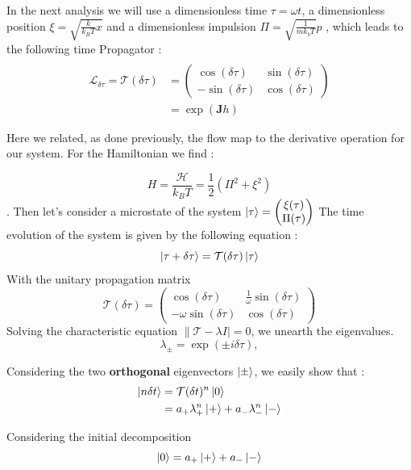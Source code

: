 \documentclass[ansiapaper]{report}
\begin{document}
\begin{multicols}{3}
  In the next analysis we will use a dimensionless time $\tau = \omega t$,  a dimensionless position $\xi = \sqrt{\frac{k}{k_BT}x}$ and a dimensionless impulsion $\Pi = \sqrt{\frac{1}{mk_bT}}p$ , which leads to the following time Propagator :
  \begin{align*}
    \\ \mathcal{L}_{\delta \tau} = \mathcal{T}(\delta \tau) &=  \left(\begin{array}{cc}
        \cos(\delta \tau)   & \sin(\delta \tau) \\
        - \sin(\delta \tau) & \cos(\delta \tau)
      \end{array}
    \right)
    \\ &=  \exp(\textbf{J}h)
  \end{align*}

  Here we related, as done previously, the flow map to the derivative operation for our system.
  For the Hamiltonian we find :

  $$ H = \frac{\mathcal{H}}{k_BT} = \frac{1}{2}(\Pi^2 + \xi^2)$$. Then let's consider a microstate of the system $\ket{\tau} = \begin{pmatrix}
      \xi(\tau) \\
      \Pi(\tau)
    \end{pmatrix}$
  The time evolution of the system is given by the following equation :
  $$ \ket{\tau + \delta \tau} = \mathcal{T}(\delta \tau) \ket{\tau}$$
  With the unitary propagation matrix $$\mathcal{T}(\delta \tau) = \begin{pmatrix}
      \cos(\delta \tau)         & \frac{1}{\omega}\sin(\delta \tau) \\
      -\omega \sin(\delta \tau) & \cos(\delta \tau)
    \end{pmatrix}$$
  Solving the characteristic equation $\lVert \mathcal{T} - \lambda I\rvert = 0$, we unearth the eigenvalues.
  $$ \lambda_\pm = \exp(\pm i \delta \tau), $$

  Considering the two \textbf{orthogonal}  eigenvectors $\ket{\pm}$, we easily show that :
  \begin{align*}
    \ket{n \delta t} & = \mathcal{T}(\delta t)^n \ket{0}                   \\
                     & = a_+ \lambda_+^n \ket{+} + a_- \lambda_-^n \ket{-} \\
  \end{align*}

  Considering the initial decomposition $$ \ket{0} = a_+ \ket{+} + a_- \ket{-}$$


\end{multicols}
\end{document}
